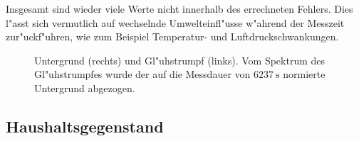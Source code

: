 \documentclass[12pt]{article}
\begin{document}
Insgesamt sind wieder viele Werte nicht innerhalb des errechneten Fehlers. Dies l"asst sich vermutlich auf wechselnde Umwelteinfl"usse w"ahrend der Messzeit zur"uck\-f"uhren, wie zum Beispiel Temperatur- und Luftdruckschwankungen.  
\begin{figure}[h!]
	\centering
	\caption[Untergrund und Gl"uhstumpf]{Untergrund (rechts) und Gl"uhstrumpf (links). Vom Spektrum des Gl"uhstrumpfes wurde der auf die Messdauer von $\SI{6237}{\second}$ normierte Untergrund abgezogen.}
	\label{fig:untergrund}
\end{figure}


\subsection{Haushaltsgegenstand}
\end{document}
